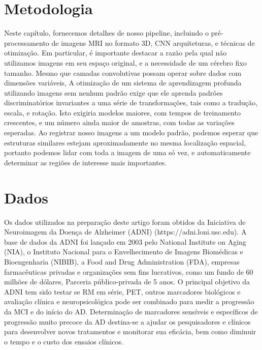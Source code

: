 \documentclass[openright]{UFRGS} %
\begin{document}
\section{Metodologia}
Neste capítulo, fornecemos detalhes de nosso pipeline, incluindo o pré-processamento de imagens MRI no formato 3D, CNN
arquiteturas, e técnicas de otimização. Em particular, é importante destacar a
razão pela qual não utilizamos imagens em seu espaço original, e a necessidade de um cérebro fixo
tamanho. Mesmo que camadas convolutivas possam operar sobre dados com dimensões variáveis,
A otimização de um sistema de aprendizagem profunda utilizando imagens sem nenhum padrão exige que ele aprenda
padrões discriminatórios invariantes a uma série de transformações, tais como a tradução,
escala, e rotação. Isto exigiria modelos maiores, com tempos de treinamento crescentes,
e um número ainda maior de amostras, com todas as variações esperadas. Ao registrar nosso
imagens a um modelo padrão, podemos esperar que estruturas similares estejam aproximadamente no
mesma localização espacial, portanto podemos lidar com toda a imagem de uma só vez, e automaticamente
determinar as regiões de interesse mais importantes.


\section{Dados}

Os dados utilizados na preparação deste artigo foram obtidos da Iniciativa de Neuroimagem da Doença de Alzheimer (ADNI) (https://adni.loni.usc.edu). A base de dados da ADNI
foi lançado em 2003 pelo National Institute on Aging (NIA), o Instituto Nacional para o Envelhecimento
de Imagens Biomédicas e Bioengenharia (NIBIB), a Food and Drug Administration
(FDA), empresas farmacêuticas privadas e organizações sem fins lucrativos, como um fundo de 60 milhões de dólares,
Parceria público-privada de 5 anos. O principal objetivo da ADNI tem sido testar se
RM em série, PET, outros marcadores biológicos e avaliação clínica e neuropsicológica
pode ser combinado para medir a progressão da MCI e do início do AD. Determinação de
marcadores sensíveis e específicos de progressão muito precoce da AD destina-se a ajudar os pesquisadores
e clínicos para desenvolver novos tratamentos e monitorar sua eficácia, bem como diminuir
o tempo e o custo dos ensaios clínicos.
\end{document}
